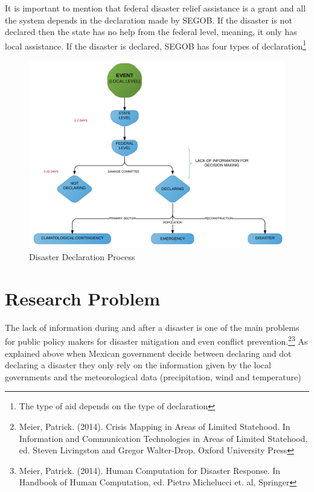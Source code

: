 \documentclass[]{article}
\let\rmarkdownfootnote\footnote%
\def\footnote{\protect\rmarkdownfootnote}
\begin{document}
\break

It is important to mention that federal disaster relief assistance is a
grant and all the system depends in the declaration made by SEGOB. If
the disaster is not declared then the state has no help from the federal
level, meaning, it only has local assistance. If the disaster is
declared, SEGOB has four types of
declaration\footnote{The type of aid depends on the type of declaration}

\begin{figure}[htbp]
\centering
\includegraphics{img/proceso1.png}
\caption{Disaster Declaration Process}
\end{figure}

\break

\section{Research Problem}\label{research-problem}

The lack of information during and after a disaster is one of the main
problems for public policy makers for disaster mitigation and even
conflict
prevention.\footnote{Meier, Patrick. (2014). Crisis Mapping in Areas of Limited Statehood. In Information and Communication Technologies in Areas of Limited Statehood, ed. Steven Livingston and Gregor Walter-Drop. Oxford University Press}\footnote{Meier, Patrick. (2014). Human Computation for Disaster Response. In Handbook of Human Computation, ed. Pietro Michelucci et. al, Springer}
As explained above when Mexican government decide between declaring and
dot declaring a disaster they only rely on the information given by the
local governments and the meteorological data (precipitation, wind and
temperature)
\end{document}
